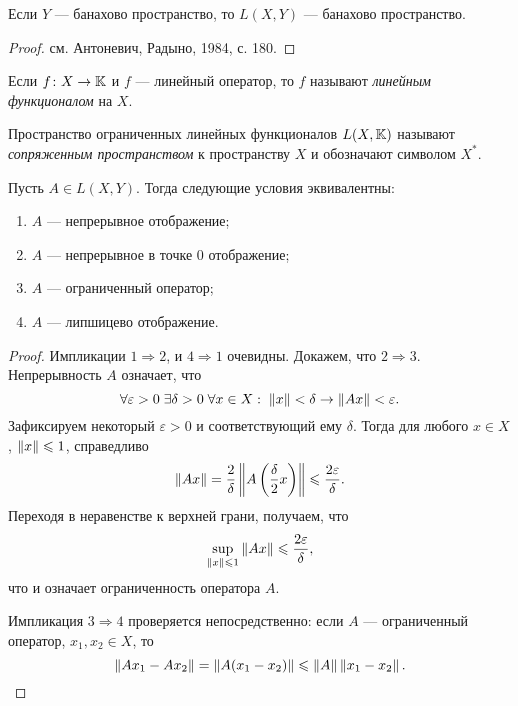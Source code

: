 \begin{theorem}
    Если $Y$ --- банахово пространство, то $L(X, Y)$ --- банахово
    пространство.
\end{theorem}

\begin{proof}
   см. Антоневич, Радыно, 1984, с. 180. 
\end{proof}

\begin{definition}
    Если $f \colon X \to \mathbb{K}$ и $f$ --- линейный оператор,
     то $f$ называют \emph{линейным функционалом} на $X$.

    Пространство ограниченных линейных функционалов $L(X, \mathbb{K})$ называют
    \emph{сопряженным пространством} к пространству $X$ и обозначают символом $X^*$.
\end{definition}

\begin{theorem}
    Пусть $A \in L(X, Y)$. Тогда следующие условия эквивалентны:
    \begin{enumerate}
        \item $A$ --- непрерывное отображение;
        \item $A$ --- непрерывное в точке $0$ отображение;
        \item $A$ --- ограниченный оператор;
        \item $A$ --- липшицево отображение.
    \end{enumerate}
\end{theorem}

\begin{proof}
    Импликации $1 \Rightarrow 2$, и $4 \Rightarrow 1$ очевидны.
    Докажем, что $2 \Rightarrow 3$.
    Непрерывность $A$ означает, что
    \[ \forall \varepsilon > 0 \; \exists \delta > 0 \; \forall x \in X: \; \left\|x\right\| <
    \delta \rightarrow \left\|Ax\right\| < \varepsilon. \]
    Зафиксируем некоторый $\varepsilon > 0$ и соответствующий ему $\delta$.
    Тогда для любого $x \in X$, $\left\|x\right\| \leqslant
    1$, справедливо
    \[ \left\|Ax\right\| = \frac{2}{\delta} \left\|A\left( \frac{\delta}{2} x \right)\right\|
    \leqslant \frac{2\varepsilon}{\delta}. \]
    Переходя в неравенстве к верхней грани, получаем, что
    \[ \sup_{\left\|x\right\| \leqslant 1}\left\|Ax\right\| \leqslant \frac{2\varepsilon}{\delta}, \]
    что и означает ограниченность оператора $A$.

    Импликация $3 \Rightarrow 4$ проверяется непосредственно: если $A$ ---
    ограниченный оператор, $x_1, x_2 \in X$, то
    \[ \left\|Ax_1 - Ax_2\right\| = \left\|A(x_1 - x_2)\right\| \leqslant \left\|A\right\| \left\|x_1 - x_2\right\|.
    \]
\end{proof}
